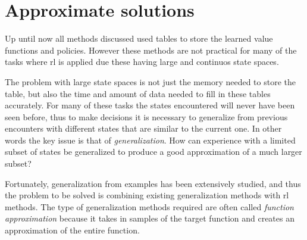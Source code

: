 \section{Approximate solutions}
\label{sec:approximate_solutions}

Up until now all methods discussed used tables to store the learned value functions and policies. However these methods are not practical for many of the tasks where \acrfull{rl} is applied due these having large and continuos state spaces. 

The problem with large state spaces is not just the memory needed to store the table, but also the time and amount of data needed to fill in these tables accurately. For many of these tasks the states encountered will never have been seen before, thus to make decisions it is necessary to generalize from previous encounters with different states that are similar to the current one. In other words the key issue is that of \emph{generalization}. How can experience with a limited subset of states be generalized to produce a good approximation of a much larger subset?

Fortunately, generalization from examples has been extensively studied, and thus the problem to be solved is combining existing generalization methods with \gls{rl} methods. The type of generalization methods required are often called \emph{function approximation} because it takes in samples of the target function and creates an approximation of the entire function.



